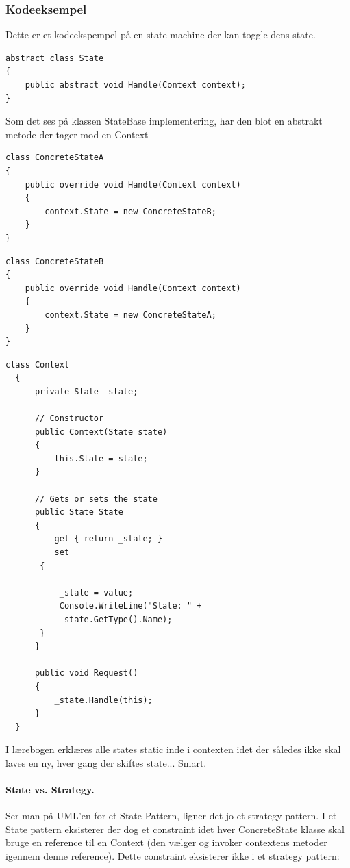 \subsubsection{Kodeeksempel}

Dette er et kodeekspempel på en state machine der kan toggle dens state.

\begin{lstlisting}[caption=StateBase klassen]
abstract class State
{
	public abstract void Handle(Context context);
}
\end{lstlisting}

Som det ses på klassen StateBase implementering, har den blot en abstrakt metode der tager mod en Context

\begin{lstlisting}[caption=ConcreteStateA klassen - Switcher til State B]
class ConcreteStateA
{
	public override void Handle(Context context)
	{
		context.State = new ConcreteStateB;
	}
}
\end{lstlisting}

\begin{lstlisting}[caption=StateBase klassen - Switcher til state A]
class ConcreteStateB
{
	public override void Handle(Context context)
	{
		context.State = new ConcreteStateA;
	}
}
\end{lstlisting}


\begin{lstlisting}[caption=Context klassen - Bruges i main() til at kalde Request()]
  class Context
  {
	  private State _state;
  
	  // Constructor
	  public Context(State state)
	  {
		  this.State = state;
	  }
  
	  // Gets or sets the state
	  public State State
	  {
		  get { return _state; }
		  set
	   {
	  
		   _state = value;
		   Console.WriteLine("State: " +
		   _state.GetType().Name);
	   }
	  }
  
	  public void Request()
	  {
		  _state.Handle(this);
	  }
  }
\end{lstlisting}
\newpage

I lærebogen erklæres alle states static inde i contexten idet der således ikke skal laves en ny, hver gang der skiftes state... Smart.

\paragraph{State vs. Strategy.}
Ser man på UML'en for et State Pattern, ligner det jo et strategy pattern. I et State  pattern eksisterer der dog et constraint idet hver ConcreteState klasse skal bruge en reference til en Context (den vælger og invoker contextens metoder igennem denne reference). Dette constraint eksisterer ikke i et strategy pattern:

